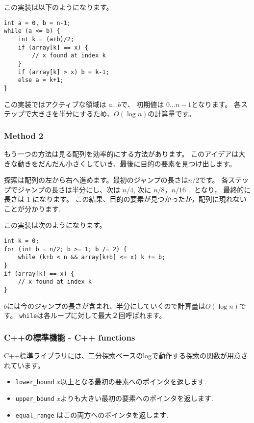 この実装は以下のようになります。
\begin{lstlisting}
int a = 0, b = n-1;
while (a <= b) {
    int k = (a+b)/2;
    if (array[k] == x) {
        // x found at index k
    }
    if (array[k] > x) b = k-1;
    else a = k+1;
}
\end{lstlisting}

この実装ではアクティブな領域は $a \ldots b$で、
初期値は $0 \ldots n-1$となります。
各ステップで大きさを半分にするため、$O(\log n)$の計算量です。

\subsubsection{Method 2}

もう一つの方法は見る配列を効率的にする方法があります。
このアイデアは大きな動きをだんだん小さくしていき、最後に目的の要素を見つけ出します。

探索は配列の左から右へ進めます。最初のジャンプの長さは$n/2$です。
各ステップでジャンプの長さは半分にし、次は $n/4$,
次に $n/8$，$n/16$ .. となり，
最終的に長さは 1 になります。
この結果、目的の要素が見つかったか，配列に現れないことが分かります.

この実装は次のようになります。
\begin{lstlisting}
int k = 0;
for (int b = n/2; b >= 1; b /= 2) {
    while (k+b < n && array[k+b] <= x) k += b;
}
if (array[k] == x) {
    // x found at index k
}
\end{lstlisting}

$b$には今のジャンプの長さが含まれ、半分にしていくので計算量は$O(\log n)$です。
\texttt{while}は各ループに対して最大２回呼ばれます。

\subsubsection{C++の標準機能 - C++ functions}

C++標準ライブラリには、二分探索ベースのlogで動作する探索の関数が用意されています。

\begin{itemize}
\item \texttt{lower\_bound} $x$以上となる最初の要素へのポインタを返します.
\item \texttt{upper\_bound} $x$よりも大きい最初の要素へのポインタを返します.
\item \texttt{equal\_range} はこの両方へのポインタを返します.
\end{itemize}

